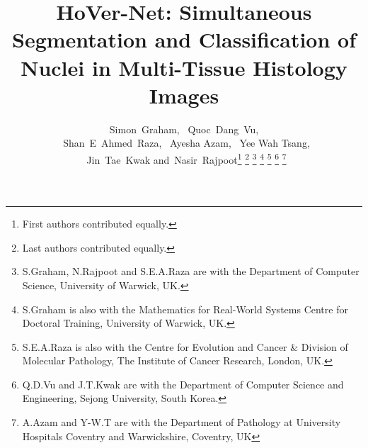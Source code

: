 \documentclass[journal]{IEEEtran}
\begin{document}


\title{HoVer-Net: Simultaneous Segmentation and Classification of Nuclei in Multi-Tissue Histology Images}
	


	
	
	\author{Simon~Graham, ~Quoc~Dang~Vu, \\ ~Shan~E~Ahmed~Raza, ~Ayesha Azam, ~Yee Wah Tsang, \\ ~Jin~Tae~Kwak
		and~Nasir~Rajpoot\thanks{ First authors contributed equally.}
		\thanks{ Last authors contributed equally.}
		\thanks{S.Graham, N.Rajpoot and S.E.A.Raza are with the Department of Computer Science, University of Warwick, UK.}
		\thanks{S.Graham is also with the Mathematics for Real-World Systems Centre for Doctoral Training, University of Warwick, UK.}
		\thanks{S.E.A.Raza is also with the Centre for Evolution and Cancer \& Division of Molecular Pathology, The Institute of Cancer Research, London, UK.}
		\thanks{Q.D.Vu and J.T.Kwak are with the Department of Computer Science and Engineering, Sejong University, South Korea.}
		\thanks{A.Azam and Y-W.T are with the Department of Pathology at University Hospitals Coventry and Warwickshire, Coventry, UK}
		}
	


	
	


	
	
	


	
	


	
	
	
\maketitle
	
\end{document}
